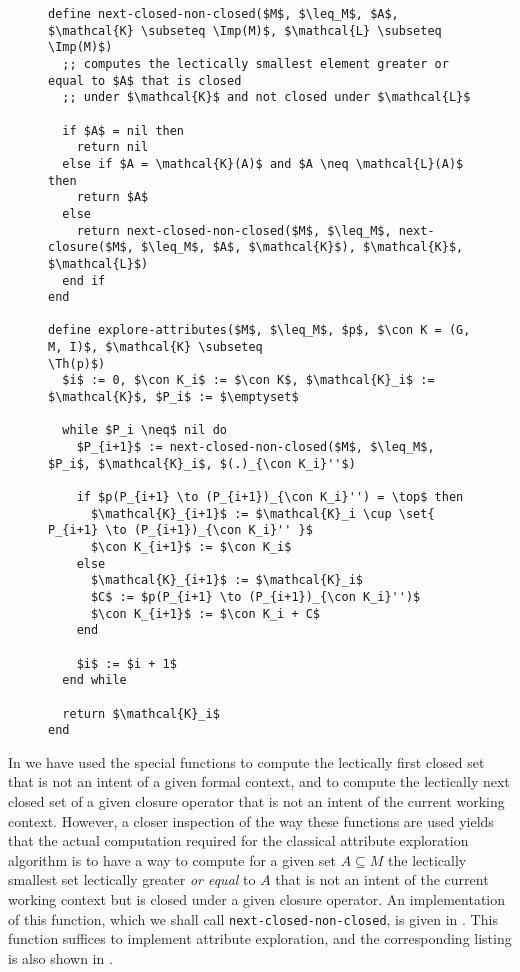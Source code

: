 
\begin{figure}[tp]
  \begin{Algorithm}
  \label{alg:explore-attributes-with-next-closed-none-closed}
  \hspace*{0cm}
\begin{lstlisting}
define next-closed-non-closed($M$, $\leq_M$, $A$, $\mathcal{K} \subseteq \Imp(M)$, $\mathcal{L} \subseteq \Imp(M)$)
  ;; computes the lectically smallest element greater or equal to $A$ that is closed
  ;; under $\mathcal{K}$ and not closed under $\mathcal{L}$

  if $A$ = nil then
    return nil
  else if $A = \mathcal{K}(A)$ and $A \neq \mathcal{L}(A)$ then
    return $A$
  else
    return next-closed-non-closed($M$, $\leq_M$, next-closure($M$, $\leq_M$, $A$, $\mathcal{K}$), $\mathcal{K}$, $\mathcal{L}$)
  end if
end

define explore-attributes($M$, $\leq_M$, $p$, $\con K = (G, M, I)$, $\mathcal{K} \subseteq
\Th(p)$)
  $i$ := 0, $\con K_i$ := $\con K$, $\mathcal{K}_i$ := $\mathcal{K}$, $P_i$ := $\emptyset$

  while $P_i \neq$ nil do
    $P_{i+1}$ := next-closed-non-closed($M$, $\leq_M$, $P_i$, $\mathcal{K}_i$, $(.)_{\con K_i}''$)

    if $p(P_{i+1} \to (P_{i+1})_{\con K_i}'') = \top$ then
      $\mathcal{K}_{i+1}$ := $\mathcal{K}_i \cup \set{ P_{i+1} \to (P_{i+1})_{\con K_i}'' }$
      $\con K_{i+1}$ := $\con K_i$
    else
      $\mathcal{K}_{i+1}$ := $\mathcal{K}_i$
      $C$ := $p(P_{i+1} \to (P_{i+1})_{\con K_i}'')$
      $\con K_{i+1}$ := $\con K_i + C$
    end

    $i$ := $i + 1$
  end while

  return $\mathcal{K}_i$  
end
\end{lstlisting}
  \end{Algorithm}
\end{figure}

In  we have used the special functions to compute the
lectically first closed set that is not an intent of a given formal context, and to
compute the lectically next closed set of a given closure operator that is not an intent
of the current working context.  However, a closer inspection of the way these functions
are used yields that the actual computation required for the classical attribute
exploration algorithm is to have a way to compute for a given set $A \subseteq M$ the
lectically smallest set lectically greater \emph{or equal} to $A$ that is not an intent of
the current working context but is closed under a given closure operator.  An
implementation of this function, which we shall call \lstinline{next-closed-non-closed},
is given in .  This function
suffices to implement attribute exploration, and the corresponding listing is also shown
in .

